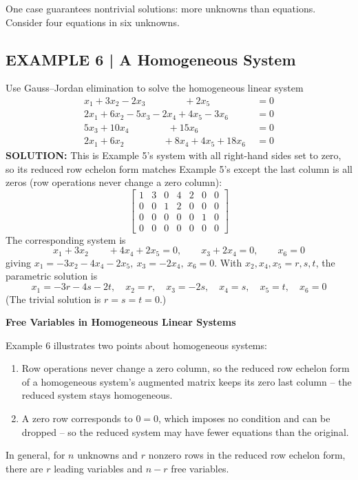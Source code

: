 \documentclass{article}
\newcommand{\redheading}[1]{{\vspace{2mm}\noindent\Large\bfseries\color{red!55!black} #1\par}\vspace{2mm}}
\theoremstyle{mystyle}
\begin{document}
One case guarantees nontrivial solutions: more unknowns than equations. Consider four equations in six unknowns.

\subsection*{EXAMPLE 6 | A Homogeneous System}
Use Gauss--Jordan elimination to solve the homogeneous linear system
\[
\begin{aligned}
x_1+3x_2-2x_3\qquad\qquad+2x_5\qquad\qquad&=0\\
2x_1+6x_2-5x_3-2x_4+4x_5-3x_6&=0\\
5x_3+10x_4\qquad\qquad+15x_6&=0\\
2x_1+6x_2\qquad\qquad+8x_4+4x_5+18x_6&=0
\end{aligned} \tag{4}
\]
\textbf{SOLUTION:} This is Example 5's system with all right-hand sides set to zero, so its reduced row echelon form matches Example 5's except the last column is all zeros (row operations never change a zero column):
\[
\begin{bmatrix}1&3&0&4&2&0&0\\0&0&1&2&0&0&0\\0&0&0&0&0&1&0\\0&0&0&0&0&0&0\end{bmatrix}
\]
The corresponding system is
\[
x_1+3x_2\qquad+4x_4+2x_5=0,\qquad x_3+2x_4=0,\qquad x_6=0
\]
giving $x_1=-3x_2-4x_4-2x_5,\ x_3=-2x_4,\ x_6=0$. With $x_2,x_4,x_5=r,s,t$, the parametric solution is
\[
x_1=-3r-4s-2t,\quad x_2=r,\quad x_3=-2s,\quad x_4=s,\quad x_5=t,\quad x_6=0
\]
(The trivial solution is $r=s=t=0$.)

\redheading{Free Variables in Homogeneous Linear Systems}

Example 6 illustrates two points about homogeneous systems:
\begin{enumerate}
    \item Row operations never change a zero column, so the reduced row echelon form of a homogeneous system's augmented matrix keeps its zero last column -- the reduced system stays homogeneous.
    \item A zero row corresponds to $0=0$, which imposes no condition and can be dropped -- so the reduced system may have fewer equations than the original.
\end{enumerate}

In general, for $n$ unknowns and $r$ nonzero rows in the reduced row echelon form, there are $r$ leading variables and $n-r$ free variables.
\end{document}
